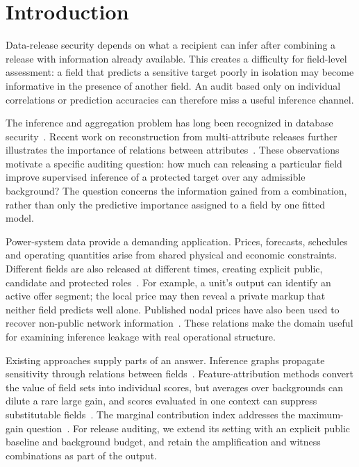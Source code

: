 \section{Introduction}\label{sec:intro}
Data-release security depends on what a recipient can infer after combining a release with information already available. This creates a difficulty for field-level assessment: a field that predicts a sensitive target poorly in isolation may become informative in the presence of another field. An audit based only on individual correlations or prediction accuracies can therefore miss a useful inference channel.

The inference and aggregation problem has long been recognized in database security~\cite{lunt1989aggregation,farkas2002inference}. Recent work on reconstruction from multi-attribute releases further illustrates the importance of relations between attributes~\cite{jiang2025correlation}. These observations motivate a specific auditing question: how much can releasing a particular field improve supervised inference of a protected target over any admissible background? The question concerns the information gained from a combination, rather than only the predictive importance assigned to a field by one fitted model.

Power-system data provide a demanding application. Prices, forecasts, schedules and operating quantities arise from shared physical and economic constraints. Different fields are also released at different times, creating explicit public, candidate and protected roles~\cite{nea2024disclosure}. For example, a unit's output can identify an active offer segment; the local price may then reveal a private markup that neither field predicts well alone. Published nodal prices have also been used to recover non-public network information~\cite{kekatos2014topology}. These relations make the domain useful for examining inference leakage with real operational structure.

Existing approaches supply parts of an answer. Inference graphs propagate sensitivity through relations between fields~\cite{hu2026ignn}. Feature-attribution methods convert the value of field sets into individual scores, but averages over backgrounds can dilute a rare large gain, and scores evaluated in one context can suppress substitutable fields~\cite{covert2020sage,lei2018loco,catav2021mci}. The marginal contribution index addresses the maximum-gain question~\cite{catav2021mci}. For release auditing, we extend its setting with an explicit public baseline and background budget, and retain the amplification and witness combinations as part of the output.

